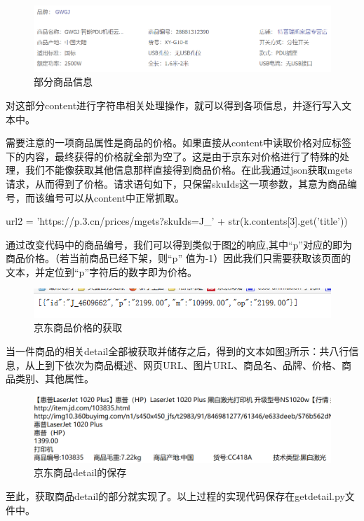 \begin{figure}[htbp]
\centering
\includegraphics[width=13.5cm]{img/dsw/dsw3.png}
\caption{部分商品信息}
\label{img:dsw3}
\end{figure}

对这部分content进行字符串相关处理操作，就可以得到各项信息，并逐行写入文本中。

需要注意的一项商品属性是商品的价格。如果直接从content中读取价格对应标签下的内容，最终获得的价格就全部为空了。这是由于京东对价格进行了特殊的处理，我们不能像获取其他信息那样直接得到商品价格。在此我通过json获取mgets请求，从而得到了价格。请求语句如下，只保留skuIds这一项参数，其意为商品编号，而该编号可以从content中正常抓取。

\begin{python}
url2 = 'https://p.3.cn/prices/mgets?skuIds=J_' + str(k.contents[3].get('title'))
\end{python}

通过改变代码中的商品编号，我们可以得到类似于图\ref{img:dsw4}的响应,其中“p”对应的即为商品价格。（若当前商品已经下架，则“p” 值为-1）因此我们只需要获取该页面的文本，并定位到“p”字符后的数字即为价格。

\begin{figure}[htbp]
\centering
\includegraphics[width=11.5cm]{img/dsw/dsw4.png}
\caption{京东商品价格的获取}
\label{img:dsw4}
\end{figure}

当一件商品的相关detail全部被获取并储存之后，得到的文本如图\ref{img:dsw5}所示：共八行信息，从上到下依次为商品概述、网页URL、图片URL、商品名、品牌、价格、商品类别、其他属性。

\begin{figure}[htbp]
\centering
\includegraphics[width=12.5cm]{img/dsw/dsw5.png}
\caption{京东商品detail的保存}
\label{img:dsw5}
\end{figure}

至此，获取商品detail的部分就实现了。以上过程的实现代码保存在getdetail.py文件中。